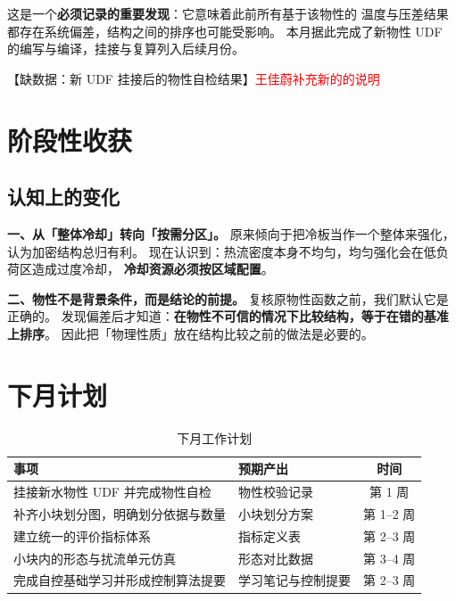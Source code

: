 \documentclass[stage1,fontset=fandol]{ydzjreport}
\begin{document}
	这是一个\textbf{必须记录的重要发现}：它意味着此前所有基于该物性的
	温度与压差结果都存在系统偏差，结构之间的排序也可能受影响。
	本月据此完成了新物性 UDF 的编写与编译，挂接与复算列入后续月份。
	
	【缺数据：新 UDF 挂接后的物性自检结果】\textcolor{red}{王佳蔚补充新的的说明}
	
	\section{阶段性收获}
	
	\subsection{认知上的变化}
	
	\textbf{一、从「整体冷却」转向「按需分区」。}
	原来倾向于把冷板当作一个整体来强化，认为加密结构总归有利。
	现在认识到：热流密度本身不均匀，均匀强化会在低负荷区造成过度冷却，
	\textbf{冷却资源必须按区域配置}。
	
	\textbf{二、物性不是背景条件，而是结论的前提。}
	复核原物性函数之前，我们默认它是正确的。
	发现偏差后才知道：\textbf{在物性不可信的情况下比较结构，等于在错的基准上排序}。
	因此把「物理性质」放在结构比较之前的做法是必要的。
	
	
	
	\section{下月计划}
	
	\begin{table}[H]
		\centering
		\caption{下月工作计划}
		\label{tab:plan}
		\begin{tabularx}{\textwidth}{@{}Y Y c@{}}
			\toprule
			 事项 & 预期产出 & 时间 \\
			\midrule
			挂接新水物性 UDF 并完成物性自检 & 物性校验记录 & 第 1 周 \\
			补齐小块划分图，明确划分依据与数量 & 小块划分方案 & 第 1--2 周 \\
			建立统一的评价指标体系 & 指标定义表 & 第 2--3 周 \\
			小块内的形态与扰流单元仿真 & 形态对比数据 & 第 3--4 周 \\
			完成自控基础学习并形成控制算法提要 & 学习笔记与控制提要 & 第 2--3 周 \\
		\end{tabularx}
	\end{table}
	
\end{document}
